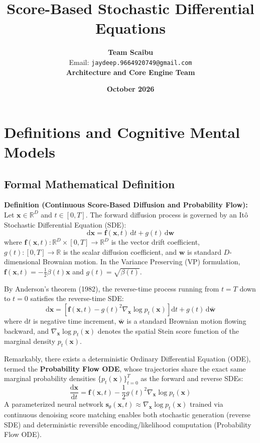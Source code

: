 \documentclass[11pt,a4paper]{article}
\title{\textbf{Score-Based Stochastic Differential Equations}}
\author{\textbf{Team Scaibu} \\ \small Email: \texttt{jaydeep.9664920749@gmail.com} \\ \small \textbf{Architecture and Core Engine Team}}
\date{\textbf{October 2026}}
\theoremstyle{definition}
\begin{document}
\maketitle

\section{Definitions and Cognitive Mental Models}

\subsection{Formal Mathematical Definition}
\textbf{Definition (Continuous Score-Based Diffusion and Probability Flow):}
Let $\mathbf{x} \in \mathbb{R}^D$ and $t \in [0, T]$. The forward diffusion process is governed by an It\^o Stochastic Differential Equation (SDE):
{\boldmath
\begin{equation}
\mathrm{d}\mathbf{x} = \mathbf{f}(\mathbf{x}, t)\,\mathrm{d}t + g(t)\,\mathrm{d}\mathbf{w}
\end{equation}
}
where $\mathbf{f}(\mathbf{x}, t): \mathbb{R}^D \times [0, T] \to \mathbb{R}^D$ is the vector drift coefficient, $g(t): [0, T] \to \mathbb{R}$ is the scalar diffusion coefficient, and $\mathbf{w}$ is standard $D$-dimensional Brownian motion. In the Variance Preserving (VP) formulation, $\mathbf{f}(\mathbf{x}, t) = -\frac{1}{2}\beta(t)\mathbf{x}$ and $g(t) = \sqrt{\beta(t)}$.

By Anderson's theorem (1982), the reverse-time process running from $t = T$ down to $t = 0$ satisfies the reverse-time SDE:
{\boldmath
\begin{equation}
\mathrm{d}\mathbf{x} = \left[ \mathbf{f}(\mathbf{x}, t) - g(t)^2 \nabla_\mathbf{x} \log p_t(\mathbf{x}) \right] \mathrm{d}t + g(t)\,\mathrm{d}\bar{\mathbf{w}}
\end{equation}
}
where $\mathrm{d}t$ is negative time increment, $\bar{\mathbf{w}}$ is a standard Brownian motion flowing backward, and $\nabla_\mathbf{x} \log p_t(\mathbf{x})$ denotes the spatial Stein score function of the marginal density $p_t(\mathbf{x})$.

Remarkably, there exists a deterministic Ordinary Differential Equation (ODE), termed the \textbf{Probability Flow ODE}, whose trajectories share the exact same marginal probability densities $\{p_t(\mathbf{x})\}_{t=0}^T$ as the forward and reverse SDEs:
{\boldmath
\begin{equation}
\frac{\mathrm{d}\mathbf{x}}{\mathrm{d}t} = \mathbf{f}(\mathbf{x}, t) - \frac{1}{2}g(t)^2 \nabla_\mathbf{x} \log p_t(\mathbf{x})
\end{equation}
}
A parameterized neural network $\mathbf{s}_\theta(\mathbf{x}, t) \approx \nabla_\mathbf{x} \log p_t(\mathbf{x})$ trained via continuous denoising score matching enables both stochastic generation (reverse SDE) and deterministic reversible encoding/likelihood computation (Probability Flow ODE).
\end{document}
